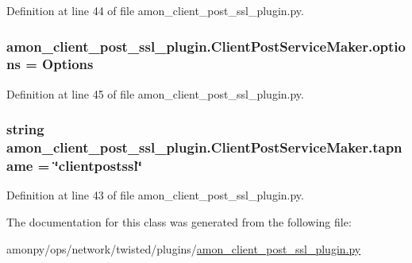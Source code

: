 Definition at line 44 of file amon\-\_\-client\-\_\-post\-\_\-ssl\-\_\-plugin.\-py.

\hypertarget{classamon__client__post__ssl__plugin_1_1_client_post_service_maker_a6609a765ab8f1abdb16ada3522a50e70}{
\subsubsection[{options}]{\setlength{\rightskip}{0pt plus 5cm}amon\-\_\-client\-\_\-post\-\_\-ssl\-\_\-plugin.\-Client\-Post\-Service\-Maker.\-options = {\bf Options}\hspace{0.3cm}{\ttfamily [static]}}}\label{classamon__client__post__ssl__plugin_1_1_client_post_service_maker_a6609a765ab8f1abdb16ada3522a50e70}


Definition at line 45 of file amon\-\_\-client\-\_\-post\-\_\-ssl\-\_\-plugin.\-py.

\hypertarget{classamon__client__post__ssl__plugin_1_1_client_post_service_maker_ae0d3fb0cb4076727bf6a0d3196173252}{
\subsubsection[{tapname}]{\setlength{\rightskip}{0pt plus 5cm}string amon\-\_\-client\-\_\-post\-\_\-ssl\-\_\-plugin.\-Client\-Post\-Service\-Maker.\-tapname = \char`\"{}clientpostssl\char`\"{}\hspace{0.3cm}{\ttfamily [static]}}}\label{classamon__client__post__ssl__plugin_1_1_client_post_service_maker_ae0d3fb0cb4076727bf6a0d3196173252}


Definition at line 43 of file amon\-\_\-client\-\_\-post\-\_\-ssl\-\_\-plugin.\-py.



The documentation for this class was generated from the following file\-:\begin{DoxyCompactItemize}
\item 
amonpy/ops/network/twisted/plugins/\hyperlink{amon__client__post__ssl__plugin_8py}{amon\-\_\-client\-\_\-post\-\_\-ssl\-\_\-plugin.\-py}\end{DoxyCompactItemize}
